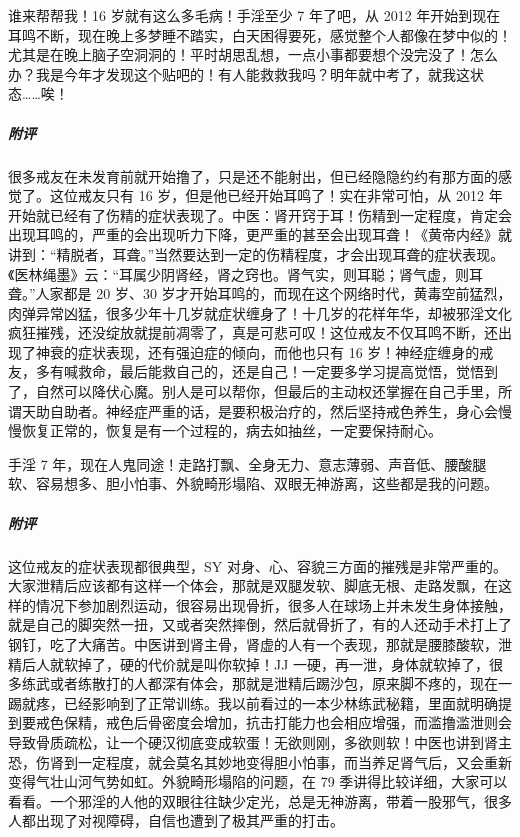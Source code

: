 \begin{case}
    谁来帮帮我！16 岁就有这么多毛病！手淫至少 7 年了吧，从 2012 年开始到现在耳鸣不断，现在晚上多梦睡不踏实，白天困得要死，感觉整个人都像在梦中似的！尤其是在晚上脑子空洞洞的！平时胡思乱想，一点小事都要想个没完没了！怎么办？我是今年才发现这个贴吧的！有人能救救我吗？明年就中考了，就我这状态……唉！
    \subparagraph{附评} 很多戒友在未发育前就开始撸了，只是还不能射出，但已经隐隐约约有那方面的感觉了。这位戒友只有 16 岁，但是他已经开始耳鸣了！实在非常可怕，从 2012 年开始就已经有了伤精的症状表现了。中医：肾开窍于耳！伤精到一定程度，肯定会出现耳鸣的，严重的会出现听力下降，更严重的甚至会出现耳聋！《黄帝内经》就讲到：“精脱者，耳聋。”当然要达到一定的伤精程度，才会出现耳聋的症状表现。《医林绳墨》云：“耳属少阴肾经，肾之窍也。肾气实，则耳聪；肾气虚，则耳聋。”人家都是 20 岁、30 岁才开始耳鸣的，而现在这个网络时代，黄毒空前猛烈，肉弹异常凶猛，很多少年十几岁就症状缠身了！十几岁的花样年华，却被邪淫文化疯狂摧残，还没绽放就提前凋零了，真是可悲可叹！这位戒友不仅耳鸣不断，还出现了神衰的症状表现，还有强迫症的倾向，而他也只有 16 岁！神经症缠身的戒友，多有喊救命，最后能救自己的，还是自己！一定要多学习提高觉悟，觉悟到了，自然可以降伏心魔。别人是可以帮你，但最后的主动权还掌握在自己手里，所谓天助自助者。神经症严重的话，是要积极治疗的，然后坚持戒色养生，身心会慢慢恢复正常的，恢复是有一个过程的，病去如抽丝，一定要保持耐心。
\end{case}

\begin{case}
    手淫 7 年，现在人鬼同途！走路打飘、全身无力、意志薄弱、声音低、腰酸腿软、容易想多、胆小怕事、外貌畸形塌陷、双眼无神游离，这些都是我的问题。
    \subparagraph{附评} 这位戒友的症状表现都很典型，SY 对身、心、容貌三方面的摧残是非常严重的。大家泄精后应该都有这样一个体会，那就是双腿发软、脚底无根、走路发飘，在这样的情况下参加剧烈运动，很容易出现骨折，很多人在球场上并未发生身体接触，就是自己的脚突然一扭，又或者突然摔倒，然后就骨折了，有的人还动手术打上了钢钉，吃了大痛苦。中医讲到肾主骨，肾虚的人有一个表现，那就是腰膝酸软，泄精后人就软掉了，硬的代价就是叫你软掉！JJ 一硬，再一泄，身体就软掉了，很多练武或者练散打的人都深有体会，那就是泄精后踢沙包，原来脚不疼的，现在一踢就疼，已经影响到了正常训练。我以前看过的一本少林练武秘籍，里面就明确提到要戒色保精，戒色后骨密度会增加，抗击打能力也会相应增强，而滥撸滥泄则会导致骨质疏松，让一个硬汉彻底变成软蛋！无欲则刚，多欲则软！中医也讲到肾主恐，伤肾到一定程度，就会莫名其妙地变得胆小怕事，而当养足肾气后，又会重新变得气壮山河气势如虹。外貌畸形塌陷的问题，在 79 季讲得比较详细，大家可以看看。一个邪淫的人他的双眼往往缺少定光，总是无神游离，带着一股邪气，很多人都出现了对视障碍，自信也遭到了极其严重的打击。
\end{case}

